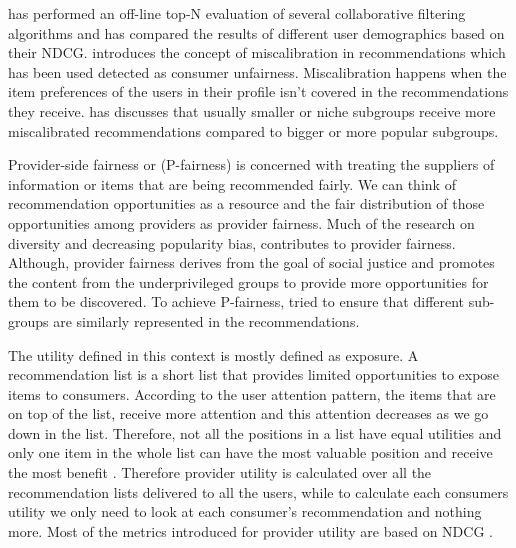     \cite{ekstrand2018all} has performed an off-line top-N evaluation of several collaborative filtering algorithms and has compared the results of different user demographics based on their NDCG.
    \cite{steck2018calibrated} introduces the concept of miscalibration in recommendations which has been used detected as consumer unfairness. Miscalibration happens when the item preferences of the users in their profile isn't covered in the recommendations they receive. \cite{Kun2020calib} has discusses that usually smaller or niche subgroups receive more miscalibrated recommendations compared to bigger or more popular subgroups.
    
        
        
        
    Provider-side fairness or (P-fairness) is concerned with treating the suppliers of information or items that are being recommended fairly. We can think of recommendation opportunities as a resource and the fair distribution of those opportunities among providers as provider fairness. 
    Much of the research on diversity and decreasing popularity bias, contributes to provider fairness. Although, provider fairness derives from the goal of social justice and promotes the content from the underprivileged groups to provide more opportunities for them to be discovered. 
    To achieve P-fairness, \cite{mehtora2018towards} tried to ensure that different sub-groups are similarly represented in the recommendations.
    
    The utility defined in this context is mostly defined as exposure. A recommendation list is a short list that provides limited opportunities to expose items to consumers. According to the user attention pattern, the items that are on top of the list, receive more attention and this attention decreases as we go down in the list. Therefore, not all the positions in a list have equal utilities and only one item in the whole list can have the most valuable position and receive the most benefit \cite{diaz2020}. Therefore provider utility is calculated over all the recommendation lists delivered to all the users, while to calculate each consumers utility we only need to look at each consumer's recommendation and nothing more. Most of the metrics introduced for provider utility are based on NDCG \cite{biega2018equity}.
    

